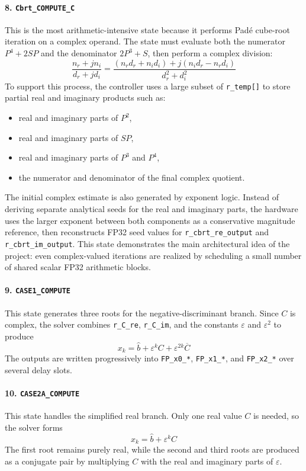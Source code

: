 \paragraph{8. \texttt{Cbrt\_COMPUTE\_C}}
This is the most arithmetic-intensive state because it performs Pad\'e cube-root iteration on a complex operand. The state must evaluate both the numerator $P^4 + 2SP$ and the denominator $2P^3 + S$, then perform a complex division:
\begin{equation}
\frac{n_r + jn_i}{d_r + jd_i}
=
\frac{(n_rd_r + n_id_i) + j(n_id_r - n_rd_i)}{d_r^2 + d_i^2}
\end{equation}
To support this process, the controller uses a large subset of \texttt{r\_temp[]} to store partial real and imaginary products such as:
\begin{itemize}
    \item real and imaginary parts of $P^2$,
    \item real and imaginary parts of $SP$,
    \item real and imaginary parts of $P^3$ and $P^4$,
    \item the numerator and denominator of the final complex quotient.
\end{itemize}
The initial complex estimate is also generated by exponent logic. Instead of deriving separate analytical seeds for the real and imaginary parts, the hardware uses the larger exponent between both components as a conservative magnitude reference, then reconstructs FP32 seed values for \texttt{r\_cbrt\_re\_output} and \texttt{r\_cbrt\_im\_output}. This state demonstrates the main architectural idea of the project: even complex-valued iterations are realized by scheduling a small number of shared scalar FP32 arithmetic blocks.

\paragraph{9. \texttt{CASE1\_COMPUTE}}
This state generates three roots for the negative-discriminant branch. Since $C$ is complex, the solver combines \texttt{r\_C\_re}, \texttt{r\_C\_im}, and the constants $\varepsilon$ and $\varepsilon^2$ to produce
\begin{equation}
x_k = \hat{b} + \varepsilon^k C + \varepsilon^{2k}\overline{C}
\end{equation}
The outputs are written progressively into \texttt{FP\_x0\_*}, \texttt{FP\_x1\_*}, and \texttt{FP\_x2\_*} over several delay slots.

\paragraph{10. \texttt{CASE2A\_COMPUTE}}
This state handles the simplified real branch. Only one real value $C$ is needed, so the solver forms
\begin{equation}
x_k = \hat{b} + \varepsilon^k C
\end{equation}
The first root remains purely real, while the second and third roots are produced as a conjugate pair by multiplying $C$ with the real and imaginary parts of $\varepsilon$.

